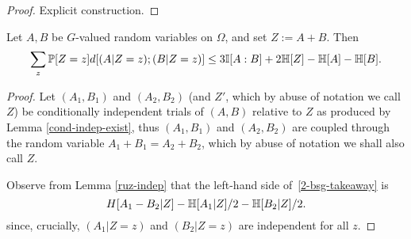 \begin{proof}\leanok Explicit construction.
\end{proof}


\begin{lemma}\label{lem-bsg}
  \leanok
  Let $A,B$ be $G$-valued random variables on $\Omega$, and set $Z := A+B$.
Then
\begin{equation}\label{2-bsg-takeaway} \sum_{z}  \mathbb{P}[Z=z] d[(A | Z = z); (B | Z = z)] \leq 3  \mathbb{I}[A:B] + 2 \mathbb{H}[Z] - \mathbb{H}[A] - \mathbb{H}[B]. \end{equation}
\end{lemma}

\begin{proof}
Let $(A_1, B_1)$ and $(A_2, B_2)$ (and $Z'$, which by abuse of notation we call $Z$) be conditionally independent trials of $(A,B)$ relative to $Z$ as produced by Lemma \ref{cond-indep-exist}, thus $(A_1,B_1)$ and $(A_2,B_2)$ are coupled through the random variable $A_1 + B_1 = A_2 + B_2$, which by abuse of notation we shall also call $Z$.

Observe from Lemma \ref{ruz-indep} that the left-hand side of~\eqref{2-bsg-takeaway} is
\begin{equation}\label{lhs-to-bound}
H[A_1 - B_2| Z] - \mathbb{H}[A_1 | Z]/2 - \mathbb{H}[B_2 | Z]/2.
\end{equation}
since, crucially, $(A_1 | Z=z)$ and $(B_2 | Z=z)$ are independent for all $z$.


\end{proof}
